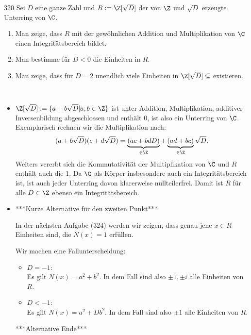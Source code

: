 \begin{algebraUE}{320}
Sei $D$ eine ganze Zahl und $R := \Z[\sqrt{D}]$ der von $\Z$ und $\sqrt{D}$
erzeugte Unterring von $\C$.
\begin{enumerate}
  \item Man zeige, dass $R$ mit der gewöhnlichen Addition und Multiplikation von $\C$
  einen Integritätsbereich bildet.
  \item Man bestimme für $D < 0$ die Einheiten in $R$.
  \item Man zeige, dass für $D = 2$ unendlich viele Einheiten in $\Z[\sqrt{D}] \subseteq $
  existieren.
\end{enumerate}
\end{algebraUE}
\begin{solution}
\leavevmode \\
\begin{itemize}
  \item $\Z[\sqrt{D}] := \{a + b\sqrt{D} | a,b \in \Z\}$ ist unter Addition, Multiplikation,
  additiver Inversenbildung abgeschlossen und enthält $0$, ist also ein Unterring von $\C$.
  Exemplarisch rechnen wir die Multiplikation nach:
  \begin{align*}
    (a + b\sqrt{D})(c + d\sqrt{D}) = \underbrace{(ac + bdD)}_{\in \Z} + \underbrace{(ad + bc)}_{\in \Z}\sqrt{D}.
  \end{align*}
  Weiters vererbt sich die Kommutativität der Multiplikation von $\C$ und $R$
  enthält auch die $1$.
  Da $\C$ als Körper insbesondere auch ein Integritätsbereich ist, ist auch
  jeder Unterring davon klarerweise nullteilerfrei. Damit ist $R$ für alle $D \in \Z$
  ebenso ein Integritätsbereich.
  \item
  ***Kurze Alternative für den zweiten Punkt***

  In der nächsten Aufgabe (324) werden wir zeigen, dass genau jene $x \in R$ Einheiten sind, die $N(x) = 1$ erfüllen.

  Wir machen eine Fallunterscheidung:
  \begin{itemize}
    \item $D = -1$: \\
    Es gilt $N(x) = a^2 + b^2$. In dem Fall sind also $\pm1,\pm i$ alle Einheiten von $R$.
    \item $D < -1$: \\
    Es gilt $N(x) = a^2 + D b^2$. In dem Fall sind also $\pm1$ alle Einheiten von $R$.
  \end{itemize}

  ***Alternative Ende***


\end{itemize}
\end{solution}
